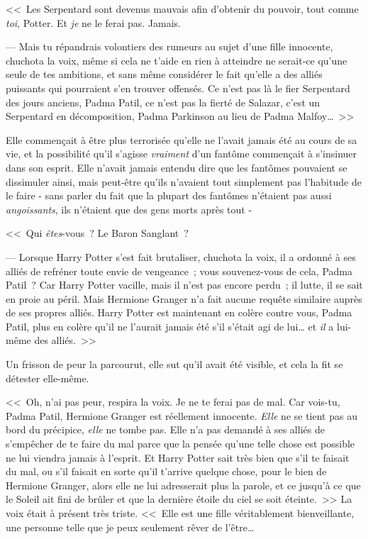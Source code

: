 <<~Les Serpentard sont devenus mauvais afin d'obtenir du pouvoir, tout comme \emph{toi}, Potter. Et \emph{je} ne le ferai pas. Jamais.

--- Mais tu répandrais volontiers des rumeurs au sujet d'une fille innocente, chuchota la voix, même si cela ne t'aide en rien à atteindre ne serait-ce qu'une seule de tes ambitions, et sans même considérer le fait qu'elle a des alliés puissants qui pourraient s'en trouver offensés. Ce n'est pas là le fier Serpentard des jours anciens, Padma Patil, ce n'est pas la fierté de Salazar, c'est un Serpentard en décomposition, Padma Parkinson au lieu de Padma Malfoy…~>>

Elle commençait à être plus terrorisée qu'elle ne l'avait jamais été au cours de sa vie, et la possibilité qu'il s'agisse \emph{vraiment} d'un fantôme commençait à s'insinuer dans son esprit. Elle n'avait jamais entendu dire que les fantômes pouvaient se dissimuler ainsi, mais peut-être qu'ils n'avaient tout simplement pas l'habitude de le faire - sans parler du fait que la plupart des fantômes n'étaient pas aussi \emph{angoissants}, ils n'étaient que des gens morts après tout -

<<~Qui \emph{êtes}-vous~? Le Baron Sanglant~?

--- Lorsque Harry Potter s'est fait brutaliser, chuchota la voix, il a ordonné à ses alliés de refréner toute envie de vengeance~; vous souvenez-vous de cela, Padma Patil~? Car Harry Potter vacille, mais il n'est pas encore perdu~; il lutte, il se sait en proie au péril. Mais Hermione Granger n'a fait aucune requête similaire auprès de ses propres alliés. Harry Potter est maintenant en colère contre vous, Padma Patil, plus en colère qu'il ne l'aurait jamais été s'il s'était agi de lui… et \emph{il} a lui-même des alliés.~>>

Un frisson de peur la parcourut, elle sut qu'il avait été visible, et cela la fit se détester elle-même.

<<~Oh, n'ai pas peur, respira la voix. Je ne te ferai pas de mal. Car vois-tu, Padma Patil, Hermione Granger est réellement innocente. \emph{Elle} ne se tient pas au bord du précipice, \emph{elle} ne tombe pas. Elle n'a pas demandé à ses alliés de s'empêcher de te faire du mal parce que la pensée qu'une telle chose est possible ne lui viendra jamais à l'esprit. Et Harry Potter sait très bien que s'il te faisait du mal, ou s'il faisait en sorte qu'il t'arrive quelque chose, pour le bien de Hermione Granger, alors elle ne lui adresserait plus la parole, et ce jusqu'à ce que le Soleil ait fini de brûler et que la dernière étoile du ciel se soit éteinte.~>> La voix était à présent très triste. <<~Elle est une fille véritablement bienveillante, une personne telle que je peux seulement rêver de l'être…

